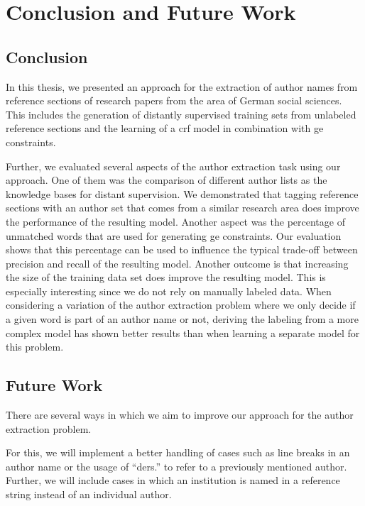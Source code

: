 \chapter{Conclusion and Future Work}\label{cha:conclusion-and-future-work}

\section{Conclusion}\label{sec:conclusion}

In this thesis, we presented an approach for the extraction of author names from reference sections of research papers from the area of German social sciences.
This includes the generation of distantly supervised training sets from unlabeled reference sections and the learning of a \gls{crf} model in combination with \gls{ge} constraints.

Further, we evaluated several aspects of the author extraction task using our approach.
One of them was the comparison of different author lists as the knowledge bases for distant supervision.
We demonstrated that tagging reference sections with an author set that comes from a similar research area does improve the performance of the resulting model.
Another aspect was the percentage of unmatched words that are used for generating \gls{ge} constraints.
Our evaluation shows that this percentage can be used to influence the typical trade-off between \gls{precision} and \gls{recall} of the resulting model.
Another outcome is that increasing the size of the training data set does improve the resulting model.
This is especially interesting since we do not rely on manually labeled data.
When considering a variation of the author extraction problem where we only decide if a given word is part of an author name or not, deriving the labeling from a more complex model has shown better results than when learning a separate model for this problem.


\section{Future Work}\label{sec:future-work}

There are several ways in which we aim to improve our approach for the author extraction problem.

For this, we will implement a better handling of cases such as line breaks in an author name or the usage of ``ders.'' to refer to a previously mentioned author.
Further, we will include cases in which an institution is named in a reference string instead of an individual author.

